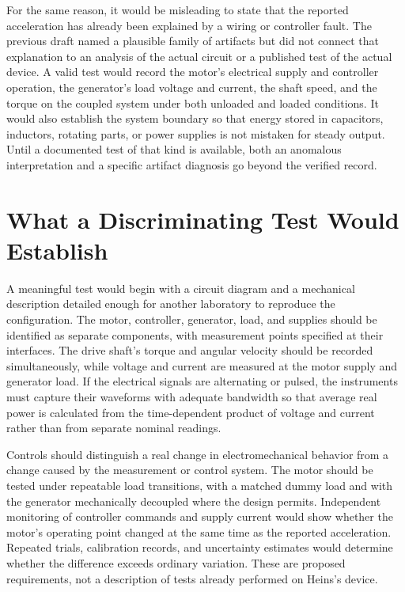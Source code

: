 \documentclass[11pt]{article}
\begin{document}
For the same reason, it would be misleading to state that the reported acceleration has already been explained by a wiring or controller fault. The previous draft named a plausible family of artifacts but did not connect that explanation to an analysis of the actual circuit or a published test of the actual device. A valid test would record the motor's electrical supply and controller operation, the generator's load voltage and current, the shaft speed, and the torque on the coupled system under both unloaded and loaded conditions. It would also establish the system boundary so that energy stored in capacitors, inductors, rotating parts, or power supplies is not mistaken for steady output. Until a documented test of that kind is available, both an anomalous interpretation and a specific artifact diagnosis go beyond the verified record.

\section{What a Discriminating Test Would Establish}

A meaningful test would begin with a circuit diagram and a mechanical description detailed enough for another laboratory to reproduce the configuration. The motor, controller, generator, load, and supplies should be identified as separate components, with measurement points specified at their interfaces. The drive shaft's torque and angular velocity should be recorded simultaneously, while voltage and current are measured at the motor supply and generator load. If the electrical signals are alternating or pulsed, the instruments must capture their waveforms with adequate bandwidth so that average real power is calculated from the time-dependent product of voltage and current rather than from separate nominal readings.

Controls should distinguish a real change in electromechanical behavior from a change caused by the measurement or control system. The motor should be tested under repeatable load transitions, with a matched dummy load and with the generator mechanically decoupled where the design permits. Independent monitoring of controller commands and supply current would show whether the motor's operating point changed at the same time as the reported acceleration. Repeated trials, calibration records, and uncertainty estimates would determine whether the difference exceeds ordinary variation. These are proposed requirements, not a description of tests already performed on Heins's device.
\end{document}
